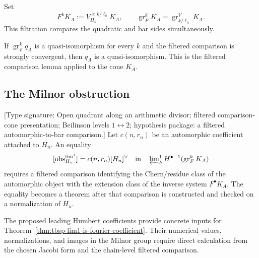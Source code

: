 \begin{definition}
\label{def:tbsp-koszul-bar-filtration}
Set
\[
 F^kK_A:=V^{\geq k/\ell_n}_{H_n}K_A,
 \qquad
 \operatorname{gr}^k_FK_A
 =\operatorname{gr}^{V}_{k/\ell_n}K_A .
\]
This filtration compares the quadratic and bar sides simultaneously.
\end{definition}

\begin{lemma}
\label{lem:tbsp-positselski-on-each-Fk}
If
\(\operatorname{gr}^k_Fq_A\) is a quasi-isomorphism for every \(k\)
and the filtered comparison is strongly convergent, then \(q_A\) is a
quasi-isomorphism.  This is the filtered comparison lemma applied to
the cone \(K_A\).
\end{lemma}

\subsection{The Milnor obstruction}
\label{subsec:tbsp-lim1-obstruction}

\begin{theorem}
\label{thm:tbsp-lim1-is-fourier-coefficient}
\textup{[Type signature: Open quadrant along an arithmetic divisor;
filtered comparison-cone presentation; Beilinson levels
\(1\leftrightarrow2\); hypothesis package: a filtered
automorphic-to-bar comparison.]}
Let \(c(n,r_n)\) be an automorphic coefficient attached to \(H_n\).
An equality
\[
 [\operatorname{obs}^{\lim^1}_{H_n}]
 =
 c(n,r_n)[H_n]^\vee
 \quad\text{in}\quad
 \varprojlim\nolimits^1_k
 H^{\bullet-1}(\operatorname{gr}^k_FK_A)
\]
requires a filtered comparison identifying the Chern/residue class of
the automorphic object with the extension class of the inverse system
\(F^\bullet K_A\).  The equality becomes a theorem after that
comparison is constructed and checked on a normalization of \(H_n\).
\end{theorem}

\begin{remark}
\label{rem:tbsp-leading-three-walls-first-coefficients}
The proposed leading Humbert coefficients provide concrete inputs for
Theorem~\ref{thm:tbsp-lim1-is-fourier-coefficient}.  Their numerical
values, normalizations, and images in the Milnor group require direct
calculation from the chosen Jacobi form and the chain-level filtered
comparison.
\end{remark}


